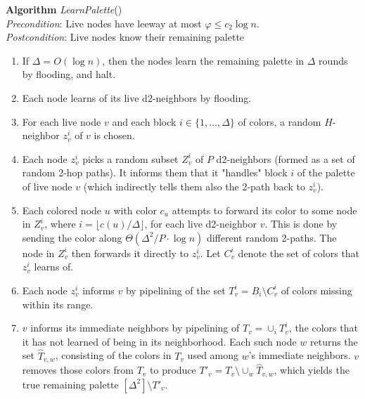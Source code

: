 \bigskip

   \textbf{Algorithm} \emph{LearnPalette}() \\
    \emph{Precondition}: Live nodes have leeway at most $\varphi \le c_2\log n$. \\
  \emph{Postcondition}: Live nodes know their remaining palette

\begin{enumerate}
  \item If $\Delta = O(\log n)$, then the nodes learn the remaining palette in $\Delta$ rounds by flooding, and halt.
  \item Each node learns of its live d2-neighbors by flooding.
  \item For each live node $v$ and each block $i \in \{1,\ldots, \Delta\}$ of colors, a random $H$-neighbor $z^i_v$ of $v$ is chosen.
  \item Each node $z^i_v$ picks a random subset $Z_v^i$ of $P$ d2-neighbors (formed as a set of random 2-hop paths).
  It informs them that it "handles" block $i$ of the palette of live node $v$ (which indirectly tells them also the 2-path back to $z^i_v$). 
  \item Each colored node $u$ with color $c_u$ attempts to forward its color to some node in $Z_v^i$, where $i = \lfloor c(u) / \Delta \rfloor$, for each live d2-neighbor $v$. 
  This is done by sending the color along $\Theta(\Delta^2/P \cdot \log n)$ different random 2-paths. The node in $Z_v^i$ then forwards it directly to $z^i_v$. Let $C^i_v$ denote the set of colors that $z^i_v$ learns of.
  \item Each node $z_v^i$ informs $v$ by pipelining of the set $T_v^i = B_i \setminus C_v^i$ of colors missing within its range. 
  \item $v$ informs its immediate neighbors by pipelining of $T_v= \cup_i T_v^i$, the colors that it has not learned of being in its neighborhood. Each such node $w$ returns the set $\hat{T}_{v,w}$, consisting of the colors in $T_v$ used among $w$'s immediate neighbors. $v$ removes those colors from $T_v$ to produce $T'_v = T_v \setminus \cup_w \hat{T}_{v,w}$, which yields the true remaining palette $[\Delta^2] \setminus T'_{v}$.
\end{enumerate}
 \medskip
 
